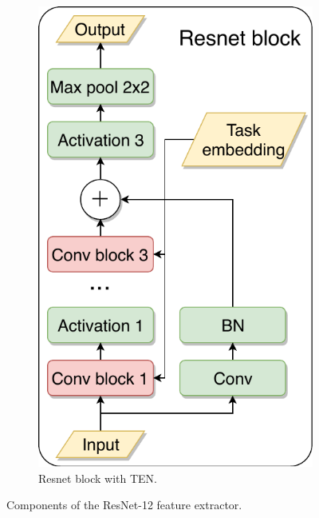 \documentclass{article}
\begin{document}
\begin{figure}[h]
\begin{subfigure}[t]{0.3\textwidth}
        \centering
        \includegraphics[width=\textwidth]{resnet_block.pdf}
        \caption{Resnet block with TEN.}
        \label{fig:resnet_block}
    \end{subfigure}
    \caption{Components of the ResNet-12 feature extractor.}
    \label{fig:ten_resnet_details}
\end{figure}
\end{document}
